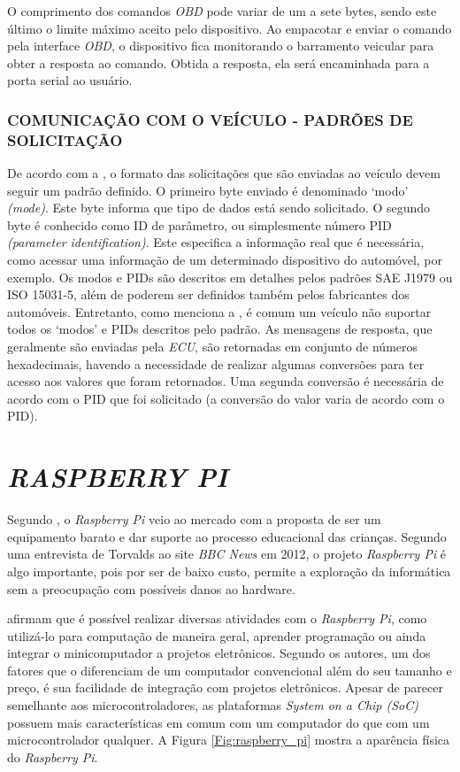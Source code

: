 O comprimento dos comandos \textit{OBD} pode variar de um a sete bytes, sendo este último o limite máximo aceito pelo dispositivo. Ao empacotar e enviar o comando pela interface \textit{OBD}, o dispositivo fica monitorando o barramento veicular para obter a resposta ao comando. Obtida a resposta, ela será encaminhada para a porta serial ao usuário.

\subsubsection{COMUNICAÇÃO COM O VEÍCULO - PADRÕES DE SOLICITAÇÃO}
De acordo com a , o formato das solicitações que são enviadas ao veículo devem seguir um padrão definido. O primeiro byte enviado é denominado ‘modo’ \textit{(mode)}. Este byte informa que tipo de dados está sendo solicitado. O segundo byte é conhecido como ID de parâmetro, ou simplesmente número PID \textit{(parameter identification)}. Este especifica a informação real que é necessária, como acessar uma informação de um determinado dispositivo do automóvel, por exemplo. Os modos e PIDs são descritos em detalhes pelos padrões SAE J1979 ou ISO 15031-5, além de poderem ser definidos também pelos fabricantes dos automóveis. Entretanto, como menciona a , é comum um veículo não suportar todos os ‘modos’ e PIDs descritos pelo padrão. As mensagens de resposta, que geralmente são enviadas pela \textit{ECU}, são retornadas em conjunto de números hexadecimais, havendo a necessidade de realizar algumas conversões para ter acesso aos valores que foram retornados. Uma segunda conversão é necessária de acordo com o PID que foi solicitado (a conversão do valor varia de acordo com o PID).

\section{\textit{RASPBERRY PI}}
Segundo , o \textit{Raspberry Pi} veio ao mercado com a proposta de ser um equipamento barato e dar suporte ao processo educacional das crianças. Segundo uma entrevista de Torvalds\nocite{torvalds} ao site \textit{BBC News} em 2012, o projeto \textit{Raspberry Pi} é algo importante, pois por ser de baixo custo, permite a exploração da informática sem a preocupação com possíveis danos ao hardware.

 afirmam que é possível realizar diversas atividades com o \textit{Raspberry Pi}, como utilizá-lo para computação de maneira geral, aprender programação ou ainda integrar o minicomputador a projetos eletrônicos. Segundo os autores, um dos fatores que o diferenciam de um computador convencional além do seu tamanho e preço, é sua facilidade de integração com projetos eletrônicos. Apesar de parecer semelhante aos microcontroladores, as plataformas \textit{System on a Chip (SoC)} possuem mais características em comum com um computador do que com um microcontrolador qualquer. A Figura \ref{Fig:raspberry_pi} mostra a aparência física do \textit{Raspberry Pi}.

